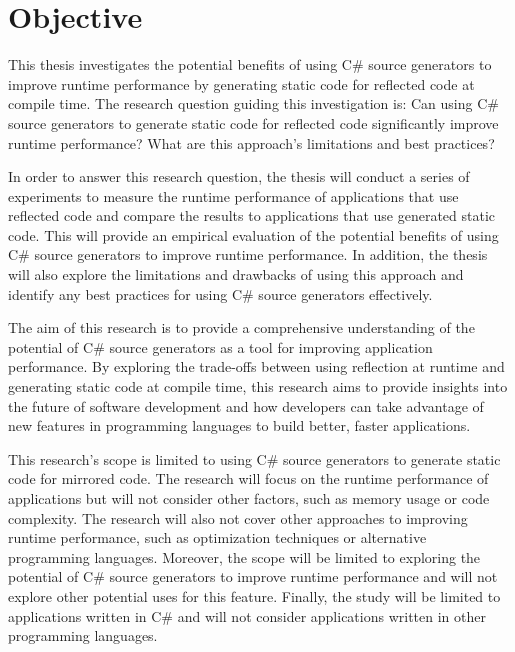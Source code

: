 \chapter{Objective}

This thesis investigates the potential benefits of using C\# source generators to improve runtime performance by generating static code for reflected code at compile time. The research question guiding this investigation is: Can using C\# source generators to generate static code for reflected code significantly improve runtime performance? What are this approach's limitations and best practices?

In order to answer this research question, the thesis will conduct a series of experiments to measure the runtime performance of applications that use reflected code and compare the results to applications that use generated static code. This will provide an empirical evaluation of the potential benefits of using C\# source generators to improve runtime performance. In addition, the thesis will also explore the limitations and drawbacks of using this approach and identify any best practices for using C\# source generators effectively.

The aim of this research is to provide a comprehensive understanding of the potential of C\# source generators as a tool for improving application performance. By exploring the trade-offs between using reflection at runtime and generating static code at compile time, this research aims to provide insights into the future of software development and how developers can take advantage of new features in programming languages to build better, faster applications.

This research's scope is limited to using C\# source generators to generate static code for mirrored code. The research will focus on the runtime performance of applications but will not consider other factors, such as memory usage or code complexity. The research will also not cover other approaches to improving runtime performance, such as optimization techniques or alternative programming languages. Moreover, the scope will be limited to exploring the potential of C\# source generators to improve runtime performance and will not explore other potential uses for this feature. Finally, the study will be limited to applications written in C\# and will not consider applications written in other programming languages.